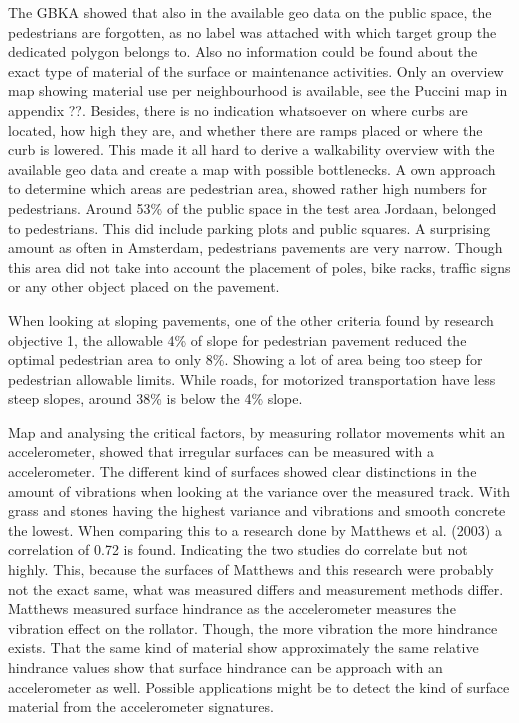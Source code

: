 The GBKA showed that also in the available geo data on the public space, the pedestrians are forgotten, as no label was attached with which target group the dedicated polygon belongs to. Also no information could be found about the exact type of material of the surface or maintenance activities. Only an overview map showing material use per neighbourhood is available, see the Puccini map in appendix ??. 
Besides, there is no indication whatsoever on where curbs are located, how high they are, and whether there are ramps placed or where the curb is lowered. 
This made it all hard to derive a walkability overview with the available geo data and create a map with possible bottlenecks. A own approach to determine which areas are pedestrian area, showed rather high numbers for pedestrians. Around 53\% of the public space in the test area Jordaan, belonged to pedestrians. This did include parking plots and public squares. A surprising amount as often in Amsterdam, pedestrians pavements are very narrow. Though this area did not take into account the placement of poles, bike racks, traffic signs or any other object placed on the pavement. 

When looking at sloping pavements, one of the other criteria found by research objective 1, the allowable 4\% of slope for pedestrian pavement reduced the optimal pedestrian area to only 8\%. Showing a lot of area being too steep for pedestrian allowable limits. While roads, for motorized transportation have less steep slopes, around 38\% is below the 4\% slope. 


Map and analysing the critical factors, by measuring rollator movements whit an accelerometer, showed that irregular surfaces can be measured with a accelerometer. The different kind of surfaces showed clear distinctions in the amount of vibrations when looking at the variance over the measured track. With grass and stones having the highest variance and vibrations and smooth concrete the lowest. When comparing this to a research done by Matthews et al. (2003) a correlation of 0.72 is found. Indicating the two studies do correlate but not highly. This, because the surfaces of Matthews and this research were probably not the exact same, what was measured differs and measurement methods differ. Matthews measured surface hindrance as the accelerometer measures the vibration effect on the rollator. Though, the more vibration the more hindrance exists. That the same kind of material show approximately the same relative hindrance values show that surface hindrance can be approach with an accelerometer as well. Possible applications might be to detect the kind of surface material from the accelerometer signatures. 

